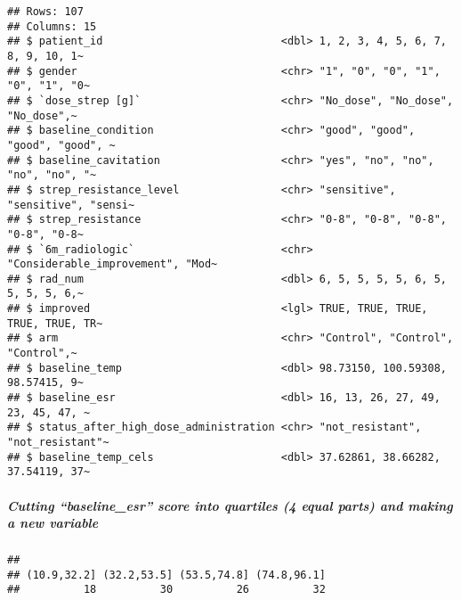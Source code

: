 \documentclass[
]{article}
\newenvironment{Shaded}{\begin{snugshade}}{\end{snugshade}}
\newcommand{\AttributeTok}[1]{\textcolor[rgb]{0.13,0.29,0.53}{#1}}
\newcommand{\DecValTok}[1]{\textcolor[rgb]{0.00,0.00,0.81}{#1}}
\newcommand{\FunctionTok}[1]{\textcolor[rgb]{0.13,0.29,0.53}{\textbf{#1}}}
\newcommand{\NormalTok}[1]{#1}
\newcommand{\OtherTok}[1]{\textcolor[rgb]{0.56,0.35,0.01}{#1}}
\newcommand{\SpecialCharTok}[1]{\textcolor[rgb]{0.81,0.36,0.00}{\textbf{#1}}}
\begin{document}
\begin{verbatim}
## Rows: 107
## Columns: 15
## $ patient_id                            <dbl> 1, 2, 3, 4, 5, 6, 7, 8, 9, 10, 1~
## $ gender                                <chr> "1", "0", "0", "1", "0", "1", "0~
## $ `dose_strep [g]`                      <chr> "No_dose", "No_dose", "No_dose",~
## $ baseline_condition                    <chr> "good", "good", "good", "good", ~
## $ baseline_cavitation                   <chr> "yes", "no", "no", "no", "no", "~
## $ strep_resistance_level                <chr> "sensitive", "sensitive", "sensi~
## $ strep_resistance                      <chr> "0-8", "0-8", "0-8", "0-8", "0-8~
## $ `6m_radiologic`                       <chr> "Considerable_improvement", "Mod~
## $ rad_num                               <dbl> 6, 5, 5, 5, 5, 6, 5, 5, 5, 5, 6,~
## $ improved                              <lgl> TRUE, TRUE, TRUE, TRUE, TRUE, TR~
## $ arm                                   <chr> "Control", "Control", "Control",~
## $ baseline_temp                         <dbl> 98.73150, 100.59308, 98.57415, 9~
## $ baseline_esr                          <dbl> 16, 13, 26, 27, 49, 23, 45, 47, ~
## $ status_after_high_dose_administration <chr> "not_resistant", "not_resistant"~
## $ baseline_temp_cels                    <dbl> 37.62861, 38.66282, 37.54119, 37~
\end{verbatim}

\subparagraph{Cutting ``baseline\_esr'' score into quartiles (4 equal
parts) and making a new
variable}\label{cutting-baseline_esr-score-into-quartiles-4-equal-parts-and-making-a-new-variable}

\begin{Shaded}
\end{Shaded}

\begin{verbatim}
## 
## (10.9,32.2] (32.2,53.5] (53.5,74.8] (74.8,96.1] 
##          18          30          26          32
\end{verbatim}
\end{document}
